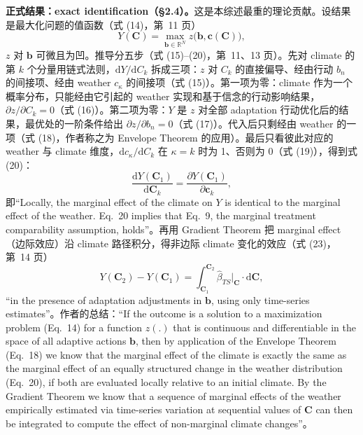 \textbf{正式结果：exact identification（\S 2.4）。}这是本综述最重的理论贡献。设结果是最大化问题的值函数（式 (14)，第~11 页）
\begin{equation*}
Y(\mathbf{C}) = \max_{\mathbf{b}\in\mathbb{R}^N} z\bigl(\mathbf{b}, \mathbf{c}(\mathbf{C})\bigr),
\end{equation*}
$z$ 对 $\mathbf{b}$ 可微且为凹。推导分五步（式 (15)--(20)，第~11、13 页）。先对 climate 的第 $k$ 个分量用链式法则，$\mathrm{d}Y/\mathrm{d}C_k$ 拆成三项：$z$ 对 $C_k$ 的直接偏导、经由行动 $b_n$ 的间接项、经由 weather $c_\kappa$ 的间接项（式 (15)）。第一项为零：climate 作为一个概率分布，只能经由它引起的 weather 实现和基于信念的行动影响结果，$\partial z/\partial C_k=0$（式 (16)）。第二项为零：$Y$ 是 $z$ 对全部 adaptation 行动优化后的结果，最优处的一阶条件给出 $\partial z/\partial b_n=0$（式 (17)）。代入后只剩经由 weather 的一项（式 (18)，作者称之为 Envelope Theorem 的应用）。最后只看彼此对应的 weather 与 climate 维度，$\mathrm{d}c_\kappa/\mathrm{d}C_k$ 在 $\kappa=k$ 时为 1、否则为 0（式 (19)），得到式 (20)：
\begin{equation*}
\frac{\mathrm{d}Y(\mathbf{C}_1)}{\mathrm{d}\mathbf{C}_k} = \frac{\partial Y(\mathbf{C}_1)}{\partial \mathbf{c}_k} ,
\end{equation*}
即``Locally, the marginal effect of the climate on $Y$ is identical to the marginal effect of the weather. Eq.~20 implies that Eq.~9, the marginal treatment comparability assumption, holds''\citep[式 (20) 及引文，第~13 页]{hsiang2016climate}。再用 Gradient Theorem 把 marginal effect（边际效应）沿 climate 路径积分，得非边际 climate 变化的效应（式 (23)，第~14 页）
\begin{equation}
Y(\mathbf{C}_2) - Y(\mathbf{C}_1) = \int_{\mathbf{C}_1}^{\mathbf{C}_2} \hat\beta_{TS}\big|_{\mathbf{C}} \cdot \mathrm{d}\mathbf{C} ,
\label{eq:hs-integral}
\end{equation}
``in the presence of adaptation adjustments in $\mathbf{b}$, using only time-series estimates''\citep[式 (23) 及引文，第~14 页]{hsiang2016climate}。作者的总结：``If the outcome is a solution to a maximization problem (Eq.~14) for a function $z(.)$ that is continuous and differentiable in the space of all adaptive actions $\mathbf{b}$, then by application of the Envelope Theorem (Eq.~18) we know that the marginal effect of the climate is exactly the same as the marginal effect of an equally structured change in the weather distribution (Eq.~20), if both are evaluated locally relative to an initial climate. By the Gradient Theorem we know that a sequence of marginal effects of the weather empirically estimated via time-series variation at sequential values of $\mathbf{C}$ can then be integrated to compute the effect of non-marginal climate changes''\citep[第~14 页]{hsiang2016climate}。

